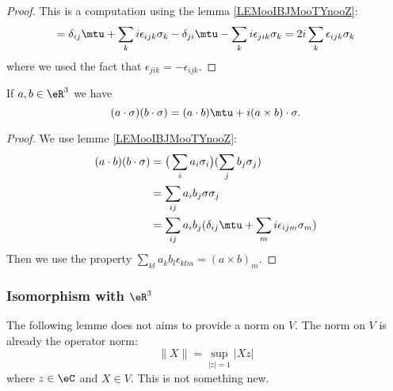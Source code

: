 \begin{proof}
    This is a computation using the lemma \ref{LEMooIBJMooTYnooZ}:
    \begin{equation}
        [\sigma_i,\sigma_j]=\delta_{ij}\mtu+\sum_ki\epsilon_{ijk}\sigma_k-\delta_{ji}\mtu-\sum_{k}i\epsilon_{jik}\sigma_k=2i\sum_k\epsilon_{ijk}\sigma_k
    \end{equation}
    where we used the fact that \( \epsilon_{jik}=-\epsilon_{ijk}\).
\end{proof}

\begin{lemma}       \label{LEMooLNCSooPHsVut}
    If \( a,b\in \eR^3\) we have
    \begin{equation}
        (a\cdot \sigma)(b\cdot \sigma)=(a\cdot b)\mtu+i(a\times b)\cdot \sigma.
    \end{equation}
\end{lemma}

\begin{proof}
    We use lemme \ref{LEMooIBJMooTYnooZ}:
    \begin{subequations}
        \begin{align}
            (a\cdot b)(b\cdot \sigma)&=\big( \sum_i a_i\sigma_i \big)(\sum_jb_j\sigma_j)\\
            &=\sum_{ij}a_ib_j\sigma\sigma_j\\
            &=\sum_{ij}a_ib_j(\delta_{ij}\mtu+\sum_mi\epsilon_{ijm}\sigma_m)
        \end{align}
    \end{subequations}
    Then we use the property \( \sum_{kl}a_kb_l\epsilon_{klm}=(a\times b)_m\).
\end{proof}

\subsubsection{Isomorphism with \( \eR^3\)}

The following lemme does not aims to provide a norm on \( V\). The norm on \( V\) is already the operator norm:
\begin{equation}
    \|X  \|=\sup_{| z |=1}| Xz |
\end{equation}
where \( z\in \eC\) and \( X\in V\). This is not something new.

